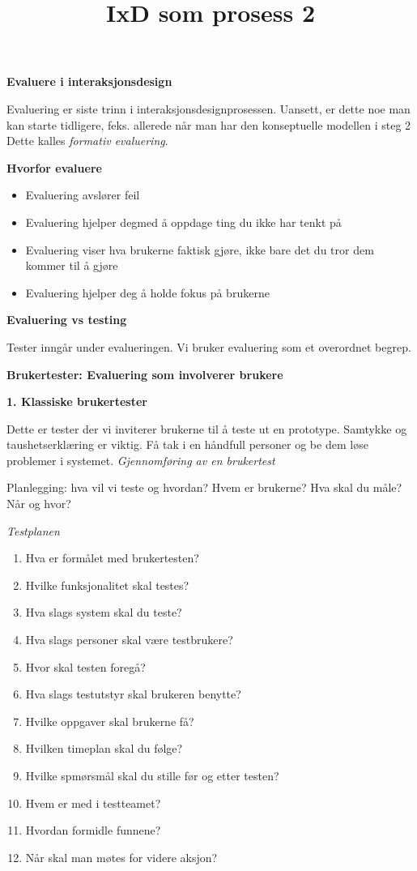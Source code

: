 \documentclass{article}
\title{IxD som prosess 2}
\begin{document}
\begin{flushleft}

\textbf{\large Evaluere i interaksjonsdesign}\par
Evaluering er siste trinn i interaksjonsdesignprosessen. 
Uansett, er dette noe man kan starte tidligere, feks. allerede når man har den konseptuelle modellen i steg 2
Dette kalles \emph{formativ evaluering}.

\bigskip

\textbf{Hvorfor evaluere}\par
\begin{itemize}
    \item Evaluering avslører feil
    \item Evaluering hjelper degmed å oppdage ting du ikke har tenkt på
    \item Evaluering viser hva brukerne faktisk gjøre, ikke bare det du tror dem kommer til å gjøre
    \item Evaluering hjelper deg å holde fokus på brukerne
\end{itemize}

\bigskip

\textbf{Evaluering vs testing}\par
Tester inngår under evalueringen. Vi bruker evaluering som et overordnet begrep.

\bigskip

\textbf{\large Brukertester: Evaluering som involverer brukere}\par
\bigskip
\textbf{1. Klassiske brukertester}\par
Dette er tester der vi inviterer brukerne til å teste ut en prototype. 
Samtykke og taushetserklæring er viktig.
Få tak i en håndfull personer og be dem løse problemer i systemet. 
\emph{Gjennomføring av en brukertest}\par
Planlegging: hva vil vi teste og hvordan? Hvem er brukerne? Hva skal du måle? Når og hvor?\par
\bigskip

\emph{Testplanen}
\begin{enumerate}
    \item Hva er formålet med brukertesten?
    \item Hvilke funksjonalitet skal testes? 
    \item Hva slags system skal du teste?
    \item Hva slags personer skal være testbrukere? 
    \item Hvor skal testen foregå?
    \item Hva slags testutstyr skal brukeren benytte?
    \item Hvilke oppgaver skal brukerne få? 
    \item Hvilken timeplan skal du følge?
    \item Hvilke spmørsmål skal du stille før og etter testen?
    \item Hvem er med i testteamet? 
    \item Hvordan formidle funnene?
    \item Når skal man møtes for videre aksjon? 
\end{enumerate}


\end{flushleft}
\end{document}

